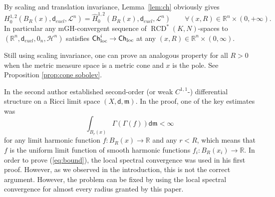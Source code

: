 \documentclass[a4paper,11pt,reqno]{article}
\numberwithin{equation}{section}
\theoremstyle{plain}
\theoremstyle{definition}
\theoremstyle{remark}
\newcommand{\Ch}{{\sf Ch}}
\newcommand{\dist}{\mathsf{d}}
\newcommand{\meas}{\mathfrak{m}}
\DeclareMathOperator{\RCD}{RCD}
\begin{document}
{\begin{remark} By scaling and translation invariance, Lemma~\ref{lem:ch} obviously gives
\begin{equation}\label{eq:example}
H^{1,2}_0(B_R(x), \dist_{eucl}, \mathcal{L}^n)=\hat{H}^{1, 2}_0(B_R(x), \dist_{eucl}, \mathcal{L}^n)
\qquad\forall (x, R) \in \mathbb{R}^n \times (0, +\infty).
\end{equation}
In particular any mGH-convergent sequence of $\RCD^*(K, N)$-spaces to $(\mathbb{R}^n, \dist_{eucl}, 0_n, \mathcal{H}^n)$ satisfies $\Ch^i_{\mathrm{loc}} \to \Ch_{\mathrm{loc}}$ at any $(x, R) \in \mathbb{R}^n \times (0, \infty)$.

Still using scaling invariance, one can prove an analogous property for all $R>0$ when
the metric measure space is a metric cone and $x$ is the pole. See Proposition \ref{prop:cone sobolev}.

\end{remark}

\begin{remark}
In \cite{Honda} the second author established second-order (or weak $C^{1, 1}$-) differential structure on a Ricci limit space $(X, \dist, \meas)$.
In the proof, one of the key estimates was
\begin{equation}\label{eq:bound}
\int_{B_r(x)}\Gamma(\Gamma(f))\dist \meas<\infty
\end{equation}
for any limit harmonic function $f: B_R(x) \to \mathbb{R}$ and any $r<R$, which means that $f$ is the uniform limit 
function of smooth harmonic functions $f_i:B_R(x_i) \to \mathbb{R}$.
In order to prove (\ref{eq:bound}), the local spectral convergence was used in his first proof.
However, as we observed in the introduction, this is not the correct argument. However, the problem can be fixed
by using the local spectral convergence for almost every radius granted by this paper. 
\end{remark}

}
\end{document}

